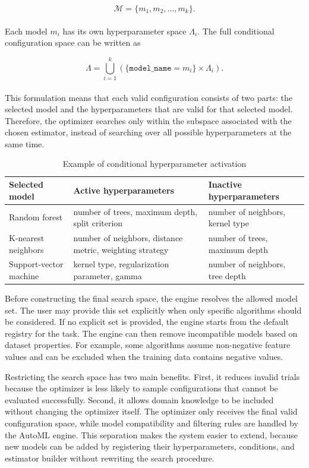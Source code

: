 \documentclass[12pt,a4paper,oneside]{report}
\begin{document}
\[
\mathcal{M} = \{m_1, m_2, \ldots, m_k\}.
\]
\\
Each model \(m_i\) has its own hyperparameter space \(\Lambda_i\). The full
conditional configuration space can be written as

\[
\Lambda =
\bigcup_{i=1}^{k}
\left(
\{\texttt{model\_name} = m_i\} \times \Lambda_i
\right).
\]
\\
This formulation means that each valid configuration consists of two parts: the
selected model and the hyperparameters that are valid for that selected model.
Therefore, the optimizer searches only within the subspace associated with the
chosen estimator, instead of searching over all possible hyperparameters at the
same time.

\begin{table}[H]
\centering
\caption{Example of conditional hyperparameter activation}
\label{tab:conditional-hyperparameters}
\begin{tabular}{p{}p{}p{}}
\toprule
Selected model & Active hyperparameters & Inactive hyperparameters \\
\midrule
Random forest
& number of trees, maximum depth, split criterion
& number of neighbors, kernel type \\
\midrule
K-nearest neighbors
& number of neighbors, distance metric, weighting strategy
& number of trees, maximum depth \\
\midrule
Support-vector machine
& kernel type, regularization parameter, gamma
& number of neighbors, tree depth \\
\bottomrule
\end{tabular}
\end{table}

\noindent Before constructing the final search space, the engine resolves the allowed model
set. The user may provide this set explicitly when only specific algorithms
should be considered. If no explicit set is provided, the engine starts from the
default registry for the task. The engine can then remove incompatible models
based on dataset properties. For example, some algorithms assume non-negative
feature values and can be excluded when the training data contains negative
values.

\noindent Restricting the search space has two main benefits. First, it reduces invalid
trials because the optimizer is less likely to sample configurations that cannot
be evaluated successfully. Second, it allows domain knowledge to be included
without changing the optimizer itself. The optimizer only receives the final
valid configuration space, while model compatibility and filtering rules are
handled by the AutoML engine. This separation makes the system easier to extend,
because new models can be added by registering their hyperparameters,
conditions, and estimator builder without rewriting the search procedure.
\end{document}
